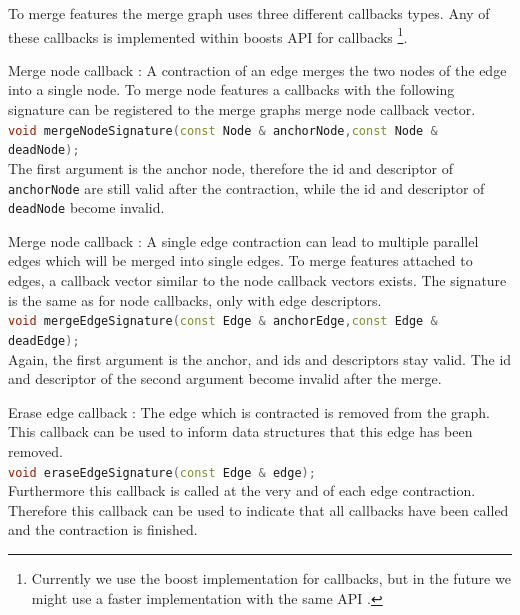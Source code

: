 To merge features the merge graph uses three different callbacks types.
Any of these callbacks is implemented within boosts API for callbacks \citep{ boost_function}
\footnote{
Currently we use the boost implementation for callbacks, but 
in the future we might use a faster implementation with the same API  \citep{code_project_function}.
}.


\begin{compactitem}
\item Merge node callback :
    A contraction of an edge merges the two nodes of the edge
    into a single node.
    To merge node features a callbacks with the following signature 
    can be registered to the merge graphs merge node callback vector.
    \\
    \lstinline[language=c++]{void mergeNodeSignature(const Node & anchorNode,const Node & deadNode);}
    \\
    The first argument is the anchor node, therefore the id and descriptor of
    \lstinline{anchorNode} are still  valid after the contraction, while
    the  id and descriptor of \lstinline{deadNode} become invalid.


\item Merge node callback :
    A single edge contraction can lead to multiple parallel edges
    which will be merged into single edges.
    To merge features attached to edges, a callback vector
    similar to the node callback vectors exists.
    The signature is the same as for node callbacks, only with 
    edge descriptors.
    \\
    \lstinline[language=c++]{void mergeEdgeSignature(const Edge & anchorEdge,const Edge & deadEdge);}
    \\
    Again, the first argument is the anchor, and ids and descriptors stay valid.
    The id and descriptor of the second argument become invalid after the merge.

\item Erase edge callback :
    The edge which is contracted is removed from the graph.
    This callback can be used to inform data structures 
    that this edge has been removed.
    \\
    \lstinline[language=c++]{void eraseEdgeSignature(const Edge & edge);}
    \\
    Furthermore this callback is called at the very and of each
    edge contraction. Therefore this callback can be used
    to indicate that all callbacks have been called and
    the contraction is finished.

\end{compactitem}





